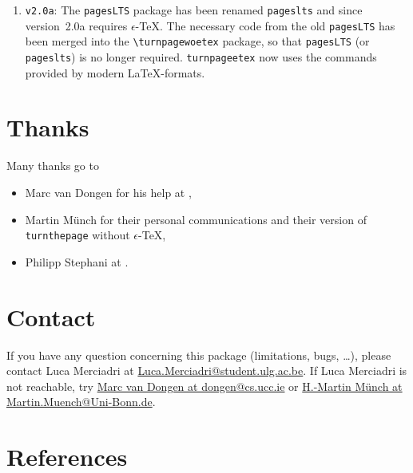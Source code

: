\documentclass[12pt,a4paper,twoside]{article}
\providecommand{\etex}{$\epsilon$-\TeX}
\begin{document}
\begin{enumerate}
\begin{verbatim}
\usepackage[option]{turnpagewoetex}
\end{verbatim}
                     and the same remark applies for \verb|turnpageetex|. Many thanks go to Mx. Martin M\"unch for this, who also added info messages depending on the package's status so that the user is now more aware about what's going on.
 \item \verb|v2.0a|: The \verb|pagesLTS| package has been renamed \verb|pageslts| and since version~2.0a requires \etex.
                     The necessary code from the old \verb|pagesLTS| has been merged into the  \verb|\turnpagewoetex| package,
                     so that \verb|pagesLTS| (or \verb|pageslts|) is no longer required.
                     \verb|turnpageetex| now uses the commands provided by modern \LaTeX-formats.
\end{enumerate}

\section{Thanks}
Many thanks go to
\begin{itemize}
\item Marc van Dongen for his help at \cite{mvd1},
\item Martin M\"unch for their personal communications and their version of \verb|turnthepage| without \etex,
\item Philipp Stephani at \cite{ps}.
\end{itemize}

\section{Contact}
If you have any question concerning this package (limitations, bugs, \ldots),
please contact Luca Merciadri at
\href{mailto:Luca.Merciadri@student.ulg.ac.be}{Luca.Merciadri@student.ulg.ac.be}.
If Luca Merciadri is not reachable, try
\href{mailto:dongen@cs.ucc.ie}{Marc van Dongen at  dongen@cs.ucc.ie} or
\href{mailto:Martin.Muench@Uni-Bonn.de}{H.-Martin M\"unch at Martin.Muench@Uni-Bonn.de}.
\newpage
{}
\makeatletter{}\makeatother
\newpage
\section{References}
\nocite{*}

\label{biblio}

\end{document}
